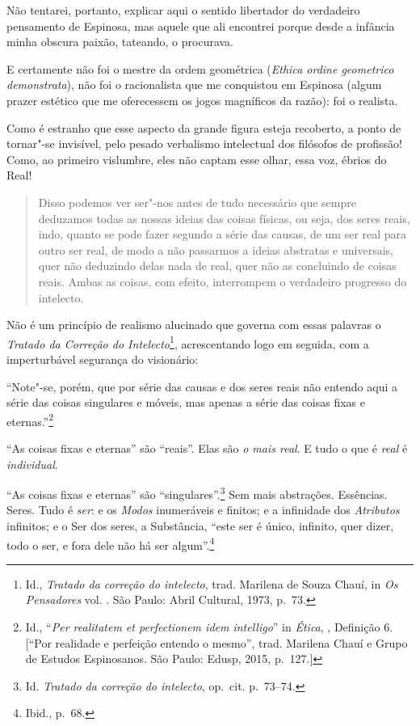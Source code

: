 Não tentarei, portanto, explicar aqui o sentido libertador do verdadeiro
pensamento de Espinosa, mas aquele que ali encontrei porque desde a
infância minha obscura paixão, tateando, o procurava.

E certamente não foi o mestre da ordem geométrica (\emph{Ethica ordine
geometrico demonstrata}), não foi o racionalista que me conquistou em
Espinosa (algum prazer estético que me oferecessem os jogos magníficos
da razão): foi o realista.

Como é estranho que esse aspecto da grande figura esteja recoberto, a
ponto de tornar"-se invisível, pelo pesado verbalismo intelectual dos
filósofos de profissão! Como, ao primeiro vislumbre, eles não captam esse
olhar, essa voz, ébrios do Real!

\begin{quote}
Disso podemos ver ser"-nos antes de tudo necessário que sempre deduzamos
todas as nossas ideias das coisas físicas, ou seja, dos seres reais,
indo, quanto se pode fazer segundo a série das causas, de um ser real
para outro ser real, de modo a não passarmos a ideias abstratas e
universais, quer não deduzindo delas nada de real, quer não as
concluindo de coisas reais. Ambas as coisas, com efeito, interrompem o
verdadeiro progresso do intelecto.
\end{quote}

Não é um princípio de realismo alucinado que governa com essas palavras
o \emph{Tratado da Correção do Intelecto}\footnote{Id., \emph{Tratado da
  correção do intelecto}, trad. Marilena de Souza Chauí, in \emph{Os
    Pensadores} vol. . São Paulo: Abril Cultural, 1973, p.~73.},
acrescentando logo em seguida, com a imperturbável segurança do
visionário:

``Note"-se, porém, que por série das causas e dos seres reais
não entendo aqui a série das coisas singulares e móveis, mas apenas a
série das coisas fixas e eternas.''\footnote{Id., ``\emph{Per realitatem
  et perfectionem idem intelligo}'' in \emph{Ética}, , Definição 6.
  {[}``Por realidade e perfeição entendo o mesmo'', trad. Marilena Chauí
  e Grupo de Estudos Espinosanos. São Paulo: Edusp, 2015, p.~127.{]}}

``As coisas fixas e eternas'' são ``reais''. Elas são \emph{o mais real}. E
tudo o que é \emph{real} é \emph{individual}.

``As coisas fixas e eternas'' são
``singulares''.\footnote{Id. \emph{Tratado da correção do intelecto},
  op.~cit. p.~73--74.} Sem mais abstrações. Essências. Seres. Tudo é \emph{ser}:
e os \emph{Modos} inumeráveis e finitos; e a infinidade dos \emph{Atributos}
infinitos; e o Ser dos seres, a Substância, ``este ser é único,
infinito, quer dizer, todo o ser, e fora dele não há ser
algum''.\footnote{Ibid., p.~68.}

